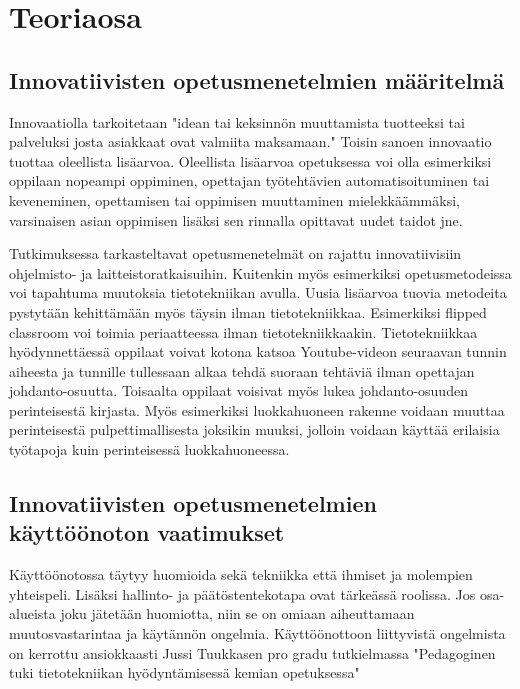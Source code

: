 \documentclass[utf8,bachelor]{gradu3}
\begin{document}




\chapter{Teoriaosa} %

\section{Innovatiivisten opetusmenetelmien määritelmä}
Innovaatiolla tarkoitetaan "idean tai keksinnön muuttamista tuotteeksi tai palveluksi josta asiakkaat ovat valmiita maksamaan." \parencite[][]{innovaatio} Toisin sanoen innovaatio tuottaa oleellista lisäarvoa. Oleellista lisäarvoa opetuksessa voi olla esimerkiksi oppilaan nopeampi oppiminen, opettajan työtehtävien automatisoituminen tai keveneminen, opettamisen tai oppimisen muuttaminen mielekkäämmäksi, varsinaisen asian oppimisen lisäksi sen rinnalla opittavat uudet taidot jne.

Tutkimuksessa tarkasteltavat opetusmenetelmät on rajattu innovatiivisiin ohjelmisto- ja laitteistoratkaisuihin. Kuitenkin myös esimerkiksi opetusmetodeissa voi tapahtuma muutoksia tietotekniikan avulla. Uusia lisäarvoa tuovia metodeita pystytään kehittämään myös täysin ilman tietotekniikkaa. Esimerkiksi flipped classroom voi toimia periaatteessa ilman tietotekniikkaakin. Tietotekniikkaa hyödynnettäessä oppilaat voivat kotona katsoa Youtube-videon seuraavan tunnin aiheesta ja tunnille tullessaan alkaa tehdä suoraan tehtäviä ilman opettajan johdanto-osuutta. \parencite[][]{flipped}Toisaalta oppilaat voisivat myös lukea johdanto-osuuden perinteisestä kirjasta. Myös esimerkiksi luokkahuoneen rakenne voidaan muuttaa perinteisestä pulpettimallisesta joksikin muuksi, jolloin voidaan käyttää erilaisia työtapoja kuin perinteisessä luokkahuoneessa.


\section{Innovatiivisten opetusmenetelmien käyttöönoton vaatimukset}
Käyttöönotossa täytyy huomioida sekä tekniikka että ihmiset ja molempien yhteispeli. Lisäksi hallinto- ja päätöstentekotapa ovat tärkeässä roolissa. Jos osa-alueista joku jätetään huomiotta, niin se on omiaan aiheuttamaan muutosvastarintaa ja käytännön ongelmia. Käyttöönottoon liittyvistä ongelmista on kerrottu ansiokkaasti Jussi Tuukkasen pro gradu tutkielmassa "Pedagoginen tuki tietotekniikan hyödyntämisessä kemian opetuksessa" %
\end{document}
